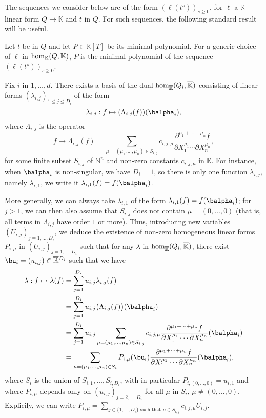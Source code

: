\documentclass[12pt]{article}
\def\N {\ensuremath{\mathbb{N}}}
\def\K{\mathbb{K}}
\def\K {\ensuremath{\mathbb{K}}}
\def\Kbar {{\ensuremath{\overline{\mathbb{K}}}}}
\def\D {\ensuremath{D}}
\begin{document}
The sequences we consider below are of the form $(\ell(t^s))_{s \ge
	0}$, for $\ell$ a $\K$-linear form $Q \to \K$ and $t$ in $Q$. For such
sequences, the following standard result will be useful.
\begin{lemma}\label{lemma:minpoly}
	Let $t$ be in $Q$ and let $P \in \K[T]$ be its minimal
	polynomial. For a generic choice of $\ell$ in ${\rm hom}_\K(Q,\K)$,
	$P$ is the minimal polynomial of the sequence $(\ell(t^s))_{s \ge
		0}$.
\end{lemma}


Fix $i$ in $1,\dots,d$.  There exists a basis of the dual ${\rm
	hom}_\Kbar(Q_i,\Kbar)$ consisting of linear forms
$(\lambda_{i,j})_{1\le j \le \D_i}$ of the form
$$\lambda_{i,j}: f \mapsto (\Lambda_{i,j}(f))(\balpha_i),$$
where $\Lambda_{i,j}$ is the operator
$$f \mapsto \Lambda_{i,j}(f) = \sum_{\mu=(\mu_1,\dots,\mu_n) \in
	S_{i,j}} c_{i,j,\mu} \frac{ \partial^{\mu_1 + \cdots + \mu_n} f}
{\partial X_1^{\mu_1} \cdots \partial X_n^{\mu_n}},$$ for some finite
subset $S_{i,j}$ of $\N^n$ and non-zero constants $c_{i,j,\mu}$ in
$\Kbar$. 
For instance, when $\balpha_i$ is non-singular, we have $D_i=1$, so
there is only one function $\lambda_{i,j}$, namely $\lambda_{i,1}$, we
write it $\lambda_{i,1}(f) = f(\balpha_i)$.

More generally, we can always take $\lambda_{i,1}$ of the form
$\lambda_{i,1}(f) = f(\balpha_i)$; for $j>1$, we can then also assume
that $S_{i,j}$ does not contain $\mu=(0,\dots,0)$ (that is, all terms
in $\Lambda_{i,j}$ have order $1$ or more). Thus, introducing new
variables $(U_{i,j})_{j =1,\dots,D_i}$, we deduce the existence of
non-zero homogeneous linear forms $P_{i,\mu}$ in
$(U_{i,j})_{j=1,\dots,D_i}$ such that for any $\lambda$ in ${\rm
	hom}_\Kbar(Q_i,\Kbar)$, there exist $\bu_i=(u_{i,j}) \in
\Kbar{}^{D_i}$ such that we have
\begin{align}\label{ell_param}
\lambda: f \mapsto \lambda(f)
&= \sum_{j=1}^{D_i} u_{i,j} \lambda_{i,j}(f)\nonumber\\
&= \sum_{j=1}^{D_i} u_{i,j} \big(\Lambda_{i,j}(f)\big)(\balpha_i)\nonumber\\
&= \sum_{j=1}^{D_i} u_{i,j}
\sum_{\mu=(\mu_1,\dots,\mu_n) \in
	S_{i,j}} c_{i,j,\mu} \frac{ \partial^{\mu_1 + \cdots + \mu_n} f}
{\partial X_1^{\mu_1} \cdots \partial X_n^{\mu_n}}(\balpha_i)\nonumber\\
&= \sum_{\mu=(\mu_1,\dots,\mu_n) \in S_i} P_{i,\mu}(\bu_i)
\frac{ \partial^{\mu_1 + \cdots + \mu_n} f}
{\partial X_1^{\mu_1} \cdots \partial X_n^{\mu_n}}(\balpha_i),
\end{align}
where $S_i$ is  the union of $S_{i,1},\dots,S_{i,D_i}$,
with in particular $P_{i,(0,\dots,0)}=u_{i,1}$ and where $P_{i,\mu}$
depends only on $(u_{i,j})_{j =2,\dots,D_i}$ for all $\mu$ in $S_i$,
$\mu \ne (0,\dots,0)$. Explicily, we can write $P_{i,\mu}=\sum_{j\in
	\{1,\dots,D_i\} \text{~such that~} \mu \in S_{i,j}} c_{i,j,\mu}
U_{i,j}$.
\end{document}
